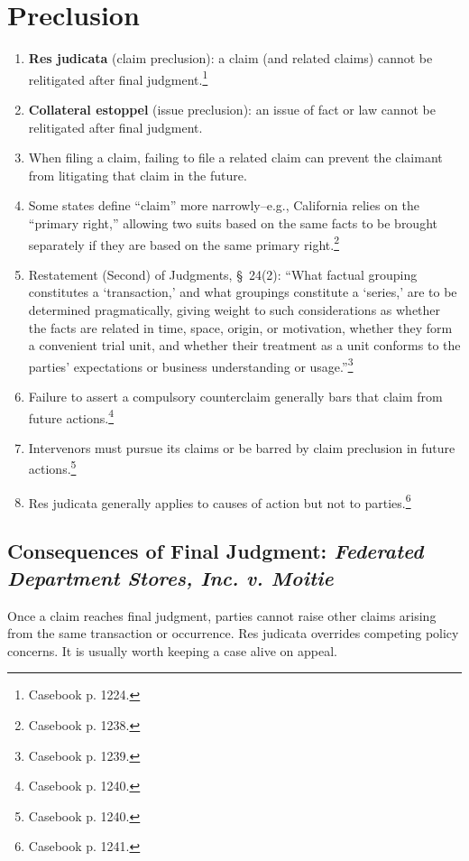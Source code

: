 \section{Preclusion}

\begin{enumerate}
    \item \textbf{Res judicata} (claim preclusion): a claim (and related 
    claims) cannot be relitigated after final judgment.\footnote{Casebook p.  
    1224.}
    \item \textbf{Collateral estoppel} (issue preclusion): an issue of fact or 
    law cannot be relitigated after final judgment.
    \item When filing a claim, failing to file a related claim can prevent the 
    claimant from litigating that claim in the future.
    \item Some states define ``claim'' more narrowly--e.g., California relies 
    on the ``primary right,'' allowing two suits based on the same facts to be 
    brought separately if they are based on the same primary 
    right.\footnote{Casebook p. 1238.}
    \item Restatement (Second) of Judgments, \S\ 24(2): ``What factual 
    grouping constitutes a `transaction,' and what groupings constitute a 
    `series,' are to be determined pragmatically, giving weight to such 
    considerations as whether the facts are related in time, space, origin, or 
    motivation, whether they form a convenient trial unit, and whether their 
    treatment as a unit conforms to the parties' expectations or business 
    understanding or usage.''\footnote{Casebook p. 1239.}
    \item Failure to assert a compulsory counterclaim generally bars that 
    claim from future actions.\footnote{Casebook p. 1240.}
    \item Intervenors must pursue its claims or be barred by claim preclusion 
    in future actions.\footnote{Casebook p. 1240.}
    \item Res judicata generally applies to causes of action but not to 
    parties.\footnote{Casebook p. 1241.}
\end{enumerate}

\subsection{Consequences of Final Judgment: \emph{Federated Department Stores, 
Inc. v. Moitie}}

Once a claim reaches final judgment, parties cannot raise other claims arising 
from the same transaction or occurrence. Res judicata overrides competing 
policy concerns. It is usually worth keeping a case alive on appeal.


